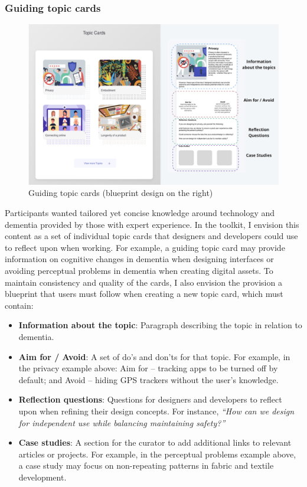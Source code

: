 \subsubsection{Guiding topic cards}
\begin{figure}[h]
\centering
\includegraphics[width=1\linewidth]{Images/D3Toolkit/Fig9.png}
\caption{Guiding topic cards (blueprint design on the right)}
\label{fig:topicCards}
\end{figure}
Participants wanted tailored yet concise knowledge around technology and dementia provided by those with expert experience. In the toolkit, I envision this content as a set of individual topic cards that designers and developers could use to reflect upon when working. For example, a guiding topic card may provide information on cognitive changes in dementia when designing interfaces or avoiding perceptual problems in dementia when creating digital assets. To maintain consistency and quality of the cards, I also envision the provision a blueprint that users must follow when creating a new topic card, which must contain:
\begin{itemize}
    \item \textbf{Information about the topic}: Paragraph describing the topic in relation to dementia.
    \item \textbf{Aim for / Avoid}: A set of do's and don'ts for that topic. For example, in the privacy example above: Aim for – tracking apps to be turned off by default; and Avoid – hiding GPS trackers without the user’s knowledge. 
    \item \textbf{Reflection questions}: Questions for designers and developers to reflect upon when refining their design concepts. For instance,\textit{ ``How can we design for independent use while balancing maintaining safety?''}
    \item \textbf{Case studies}: A section for the curator to add additional links to relevant articles or projects. For example, in the perceptual problems example above, a case study may focus on non-repeating patterns in fabric and textile development.
\end{itemize}

